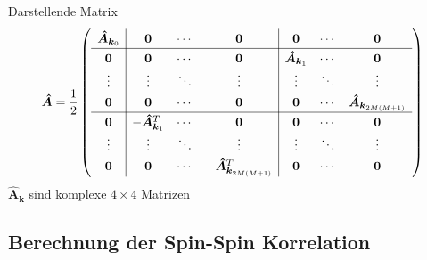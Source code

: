 \documentclass[11pt]{beamer}
\begin{document}
    
    \begin{frame}{Darstellende Matrix}
    \begin{equation} \nonumber
    \renewcommand{\arraystretch}{1.3}
    \bm{\hat{A}} = \frac{1}{2}
        \left(\begin{array}{c|ccc|ccc} 
        \bm{\hat{A}}_{\bm{k}_0}  & \bm{0}   & \cdots    & \bm{0} & \bm{0} & \cdots  & \bm{0} \\ \hline
        \bm{0}  & \bm{0}       & \cdots   & \bm{0}    & \bm{\hat{A}}_{\bm{k}_1} & \cdots  & \bm{0} \\
        \vdots  &\vdots        & \ddots   & \vdots    & \vdots                  & \ddots  & \vdots \\
        \bm{0}  & \bm{0}       & \cdots   & \bm{0} & \bm{0} & \cdots  & \bm{\hat{A}}_{\bm{k}_{2M(M+1)}}  \\ \hline
        \bm{0}  & -\bm{\hat{A}}^T_{\bm{k}_1} & \cdots  & \bm{0} & \bm{0} & \cdots  & \bm{0} \\
        \vdots  &\vdots        & \ddots   & \vdots    & \vdots                  & \ddots  & \vdots \\
        \bm{0}  & \bm{0}       & \cdots   &-\bm{\hat{A}}_{\bm{k}_{2M(M+1)}}^T & \bm{0} & \cdots  & \bm{0} 
        \end{array} \right) 
    \end{equation}
    \vspace{0.5cm}
    \centering
    $\hat{\bm{A}}_{\bm{k}}$ sind komplexe $4\times 4$ Matrizen

    \end{frame}
        
\subsection{Berechnung der Spin-Spin Korrelation}
\end{document}
